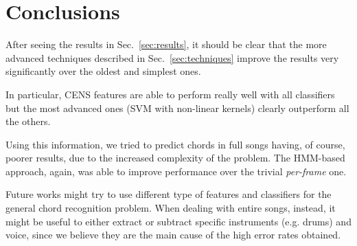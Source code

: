 \section{Conclusions}
\label{sec:conclusions}

After seeing the results in Sec.~\ref{sec:results}, it should be clear that the more advanced techniques described in Sec.~\ref{sec:techniques} improve the results very significantly over the oldest and simplest ones.

In particular, CENS features are able to perform really well with all classifiers but the most advanced ones (SVM with non-linear kernels) clearly outperform all the others.

Using this information, we tried to predict chords in full songs having, of course, poorer results, due to the increased complexity of the problem. The HMM-based approach, again, was able to improve performance over the trivial \textit{per-frame} one.

Future works might try to use different type of features and classifiers for the general chord recognition problem. When dealing with entire songs, instead, it might be useful to either extract or subtract specific instruments (e.g. drums) and voice, since we believe they are the main cause of the high error rates obtained.